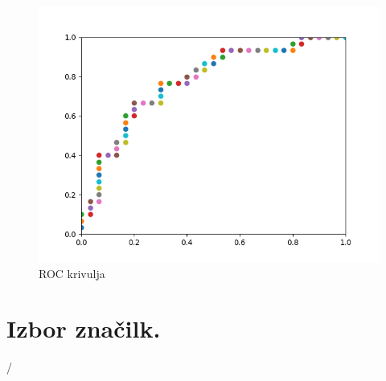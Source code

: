 \documentclass[a4paper,11pt]{article}
\begin{document}
\begin{figure}[H]
\begin{center}
\includegraphics[scale=0.3]{ROC.png}
\caption{ROC krivulja}
\label{slika4}
\end{center}
\end{figure}

\section{Izbor značilk.}
/
\end{document}
